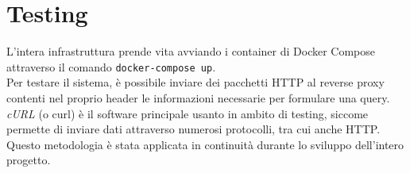 \section{Testing}
L'intera infrastruttura prende vita avviando i container di Docker Compose attraverso il comando \texttt{docker-compose up}.
\\ Per testare il sistema, è possibile inviare dei pacchetti HTTP al reverse proxy contenti nel proprio header le informazioni necessarie per formulare una query.
\\ \textit{cURL} (o curl) è il software principale usanto in ambito di testing, siccome permette di inviare dati attraverso 
numerosi protocolli, tra cui anche HTTP. 
\\ Questo metodologia è stata applicata in continuità durante lo sviluppo dell'intero progetto. 